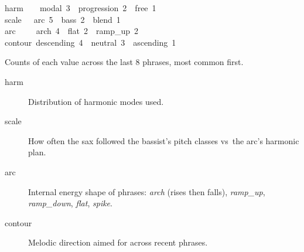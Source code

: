 \documentclass[10pt,a4paper]{article}
\newcommand{\val}[1]{\textit{#1}}
\newenvironment{dashpanel}[1]{%
  \begin{mdframed}[backgroundcolor=codebg, linecolor=dimgrey,
    linewidth=0.5pt, innerleftmargin=8pt, innerrightmargin=8pt,
    innertopmargin=4pt, innerbottommargin=4pt,
    frametitle={\scriptsize\color{dimgrey}#1},
    frametitleaboveskip=3pt, frametitlebelowskip=2pt]
  \ttfamily\small\color{codetext}
}{%
  \end{mdframed}
}
\begin{document}
\begin{dashpanel}{last 8 phrases}
harm~~~~\textcolor{codecyan}{modal}~3~~\textcolor{codecyan}{progression}~2~~\textcolor{codecyan}{free}~1\\
scale~~~\textcolor{codecyan}{arc}~5~~\textcolor{codecyan}{bass}~2~~\textcolor{codecyan}{blend}~1\\
arc~~~~~\textcolor{codecyan}{arch}~4~~\textcolor{codecyan}{flat}~2~~\textcolor{codecyan}{ramp\_up}~2\\
contour~\textcolor{codecyan}{descending}~4~~\textcolor{codecyan}{neutral}~3~~\textcolor{codecyan}{ascending}~1
\end{dashpanel}

\vspace{4pt}
Counts of each value across the last 8 phrases, most common first.

\vspace{2pt}
\begin{description}
  \item[harm] Distribution of harmonic modes used.
  \item[scale] How often the sax followed the bassist's pitch classes vs\
    the arc's harmonic plan.
  \item[arc] Internal energy shape of phrases: \val{arch} (rises then falls),
    \val{ramp\_up}, \val{ramp\_down}, \val{flat}, \val{spike}.
  \item[contour] Melodic direction aimed for across recent phrases.
\end{description}
\end{document}
